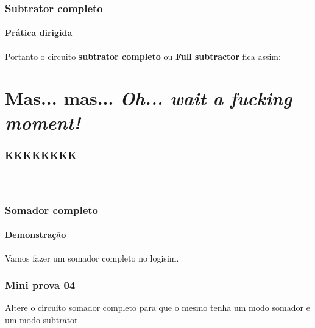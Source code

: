 \begin{frame}
	\frametitle{Subtrator completo}
	\framesubtitle{\textbf{Prática dirigida}}
	\par Portanto o circuito \textbf{subtrator completo} ou \textbf{Full subtractor} fica assim:
	\begin{figure}
		\centering
		
		\label{fig:subtratorcompleto}
	\end{figure}
\end{frame}

\section{Mas... mas... \textit{Oh... wait a fucking moment!}}

\begin{frame}
	\frametitle{KKKKKKKK}
	\begin{columns}
			\begin{figure}
			\centering
			
			\label{fig:subtratorcompleto2}
		\end{figure}
			\begin{figure}
			\centering
			
			\label{fig:somadorcompleto2}
		\end{figure}
	\end{columns}
\end{frame}

\begin{frame}
	\frametitle{Somador completo}
	\framesubtitle{\textbf{Demonstração}}
	\par Vamos fazer um somador completo no logisim.
\end{frame}

\begin{frame}
	\frametitle{Mini prova 04}
	\par Altere o circuito somador completo para que o mesmo tenha um modo somador e um modo subtrator.
\end{frame}





